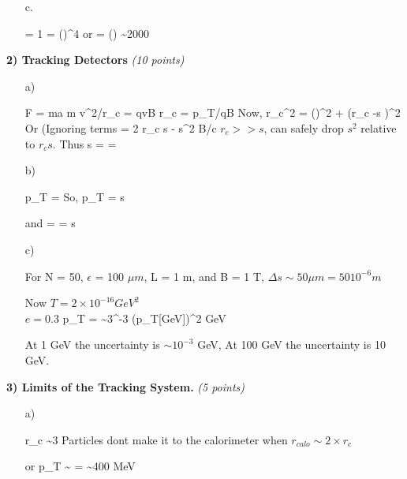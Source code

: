 {\begin{itemize}
{}
\item[c.]{
\be
{} = 1 = \left(\right)^4 
\ee
or 
\be
{}  = \left(\right) \sim 2000
\ee

}

\end{itemize}

\vspace*{0.25in}

\textbf{2) Tracking Detectors } \hfill \textit{(10 points)}\\
\begin{itemize}
\item[a)]{
\be
F = ma \Rightarrow m v^2/r_c = qvB  \Rightarrow r_c = p_T/qB
\ee
Now,
\be
r_c^2 = \left(\right)^2 + (r_c -s )^2
\ee
Or (Ignoring terms 
\be
{} = 2 r_c s - s^2
\ee
B/c $r_c >> s$, can safely drop $s^2$ relative to $r_c s$.  Thus
\be
s =  = 
\ee


}
\item[b)]{
\be
p_T = 
\ee 
So,
\be
\Delta p_T =  \Delta s 
\ee 

and
\be
{} =  =  \Delta s 
\ee 

}
\item[c)]{
For N = 50, $\epsilon$ = 100 $\mu m$, L = 1 m, and B = 1 T, $\Delta s \sim 50 \mu m = 50 10^{-6} m$

Now
$T = 2 \times 10^{-16} GeV^2$\\
$e = 0.3$
\be
\Delta p_T =    \sim 3^{-3} (p_T[GeV])^2 GeV
\ee

At 1 GeV the uncertainty is $\sim 10^{-3}$ GeV,   At 100 GeV the uncertainty is 10 GeV.
}
\end{itemize}

\clearpage


\textbf{3) Limits of the Tracking System.} \hfill \textit{(5 points)}\\

\begin{itemize}
\item[a)]{
\be
r_c \sim 3 
\ee
Particles dont make it to the calorimeter when $r_{calo} \sim 2\times r_c$

or 
\be
p_T \sim {} =  \sim 400 MeV
\ee

}
\end{itemize}}
